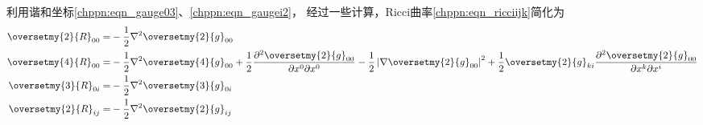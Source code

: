 利用谐和坐标\eqref{chppn:eqn_gauge03}、\eqref{chppn:eqn_gaugei2}，
经过一些计算，Ricci曲率\eqref{chppn:eqn_ricciijk}简化为
\begin{subequations}\label{chppn:eqn_ricci-gauge}
    \begin{align}
        \oversetmy{2}{R}_{00} =& -\frac{1}{2} \nabla^2 \oversetmy{2}{g}_{00} \\
        \oversetmy{4}{R}_{00} %
        =& -\frac{1}{2} \nabla^2 \oversetmy{4}{g}_{00}
        +\frac{1}{2}\frac{\partial^2 \oversetmy{2}{g}_{00}} {\partial x^0\partial x^0}
        -\frac{1}{2} \left|\nabla \oversetmy{2}{g}_{00} \right|^2 +\frac{1}{2}\oversetmy{2}{g}_{ki}\frac{\partial^2 \oversetmy{2}{g}_{00}}
        {\partial x^k\partial x^i}  \\
        \oversetmy{3}{R}_{0i} =& - \frac{1}{2} \nabla^2 \oversetmy{3}{g}_{0i} \\
        \oversetmy{2}{R}_{ij} =& - \frac{1}{2}\nabla^2 \oversetmy{2}{g}_{ij}
    \end{align}
\end{subequations}







